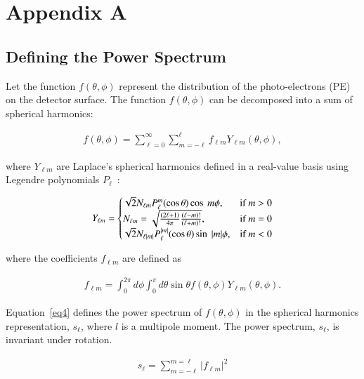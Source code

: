 \section{Appendix A}
\label{Appendix_A}

\subsection{Defining the Power Spectrum}

Let the function $f(\theta,\phi)$ represent the distribution of the
photo-electrons (PE) on the detector surface. The function
$f(\theta,\phi)$ can be decomposed into a sum of spherical harmonics:

\begin{eqnarray}
\label{eq1}
f(\theta,\phi) = \sum_{\ell=0}^{\infty} \sum_{m=-\ell}^{\ell} f_{\ell m} Y_{\ell m}(\theta,\phi),
\end{eqnarray}

where $Y_{\ell m}$ are Laplace's spherical harmonics defined in a
real-value basis using Legendre polynomials $P_{\ell}$~\cite{legendre_polynomials}:

\begin{eqnarray}
\label{eq2}
Y_{\ell m} = \left\{
  \begin{array}{@{}ll@{}}
    \sqrt{2}N_{\ell m}P_{\ell}^m(\cos\theta)\cos~m\phi, & \text{if}\ m>0 \\
    N_{\ell m} = \sqrt{\frac{(2\ell+1)}{4\pi} \frac{(\ell-m)!}{(\ell+m)!}}, & \text{if}\ m=0 \\
    \sqrt{2}N_{\ell |m|}P_{\ell}^{|m|}(\cos\theta)\sin~|m|\phi, & \text{if}\ m<0
  \end{array}\right.
\end{eqnarray}

where the coefficients $f_{\ell m}$ are defined as
 
\begin{eqnarray}
\label{eq3}
f_{\ell m} = \int_{0}^{2\pi} d\phi \int_0^{\pi} d\theta \sin\theta f(\theta,\phi) Y_{\ell m}(\theta,\phi).
\end{eqnarray}

Equation~\ref{eq4} defines the power spectrum of $f(\theta,\phi)$ in
the spherical harmonics representation, $s_{\ell}$, where $l$ is a multipole
moment. The power spectrum, $s_{\ell}$, is invariant under rotation. 

\begin{eqnarray}
\label{eq4}
s_{\ell} = \sum_{m=-\ell}^{m=\ell} |f_{\ell m}|^2
\end{eqnarray}

